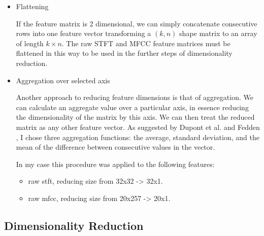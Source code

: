 \documentclass[11pt]{article}
\begin{document}
\begin{itemize}
\item Flattening

If the feature matrix is 2 dimensional, we can simply concatenate consecutive rows into one feature vector transforming a \((k,n)\) shape matrix to an array of length \(k \times n\). The raw STFT and MFCC feature matrices must be flattened in this way to be used in the further steps of dimensionality reduction.

\item Aggregation over selected axis

Another approach to reducing feature dimensions is that of aggregation. We can calculate an aggregate value over a particular axis, in essence reducing the dimensionality of the matrix by this axis. We can then treat the reduced matrix as any other feature vector. As suggested by Dupont et al. \cite{Dupont_2013} and Fedden \cite{medium}, I chose three aggregation functions: the average, standard deviation, and the mean of the difference between consecutive values in the vector.

In my case this procedure was applied to the following features:
\begin{itemize}
\item raw stft, reducing size from 32x32 -> 32x1.
\item raw mfcc, reducing size from 20x257 -> 20x1.
\end{itemize}
\end{itemize}

\subsection{Dimensionality Reduction}
\label{sec:org8ae6931}
\end{document}

